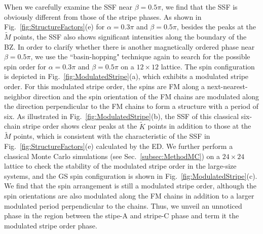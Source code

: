 \documentclass[aps,prb,reprint,amsfonts,amsmath,amssymb,showpacs,groupedaddress,superscriptaddress]{revtex4-1}
\begin{document}
When we carefully examine the SSF near $\beta=0.5\pi$, we find that the SSF is obviously different from those of the stripe phases. As shown in Fig.~\ref{fig:StructureFactors}(e) for $\alpha=0.3\pi$ and $\beta=0.5\pi$, besides the peaks at the $\tilde{M}$ points, the SSF also shows significant intensities along the boundary of the BZ. In order to clarify whether there is another magnetically ordered phase near $\beta=0.5\pi$, we use the ``basin-hopping" technique again to search for the possible spin order for $\alpha=0.3\pi$ and $\beta=0.5\pi$ on a $12 \times 12$ lattice. The spin configuration is depicted in Fig.~\ref{fig:ModulatedStripe}(a), which exhibits a modulated stripe order. For this modulated stripe order, the spins are FM along a next-nearest-neighbor direction and the spin orientation of the FM chains are modulated along the direction perpendicular to the FM chains to form a structure with a period of six. As illustrated in Fig.~\ref{fig:ModulatedStripe}(b), the SSF of this classical six-chain stripe order shows clear peaks at the $\tilde{K}$ points in addition to those at the $\tilde{M}$ points, which is consistent with the characteristic of the SSF in Fig.~\ref{fig:StructureFactors}(e) calculated by the ED. We further perform a classical Monte Carlo simulations (see Sec.~\ref{subsec:MethodMC}) on a $24 \times24$ lattice to check the stability of the modulated stripe order in the large-size systems, and the GS spin configuration is shown in Fig.~\ref{fig:ModulatedStripe}(c). We find that the spin arrangement is still a modulated stripe order, although the spin orientations are also modulated along the FM chains in addition to a larger modulated period perpendicular to the chains. Thus, we unveil an unnoticed phase in the region between the stipe-A and stripe-C phase and term it the modulated stripe order phase.
\end{document}
